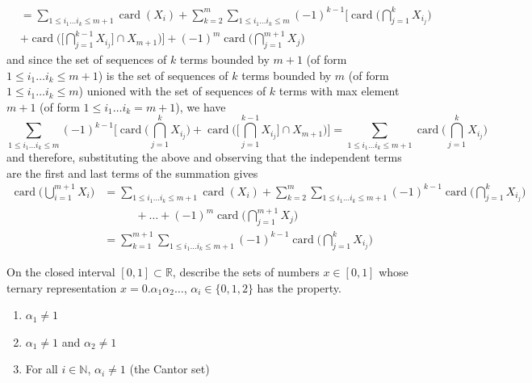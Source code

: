 \documentclass{article}
\DeclareMathOperator{\card}{card}
\begin{document}
\begin{solution}
\begin{align*}
        & = \sum_{1 \leq i_1 \ldots i_k \leq m+1} \card(X_i) + \sum_{k=2}^m \sum_{1 \leq i_1 \ldots i_k \leq m} (-1)^{k-1} \Bigg[ \card\bigg( \bigcap_{j=1}^k X_{i_j} \bigg) \\
        & +  \card\bigg( \bigg[ \bigcap_{j=1}^{k-1} X_{i_j} \bigg] \cap X_{m+1} \bigg) \Bigg] + (-1)^{m} \card\bigg( \bigcap_{j=1}^{m+1} X_j \bigg) 
    \end{align*}
    and since the set of sequences of $k$ terms bounded by $m+1$ (of form $1 \leq i_1 \ldots i_k \leq m+1$) is the set of sequences of $k$ terms bounded by $m$ (of form $1 \leq i_1 \ldots i_k \leq m$) unioned with the set of sequences of $k$ terms with max element $m+1$ (of form $1 \leq i_1 \ldots i_k = m+1$), we have 
    \[\sum_{1 \leq i_1 \ldots i_k \leq m} (-1)^{k-1} \Bigg[ \card\bigg( \bigcap_{j=1}^k X_{i_j} \bigg) +  \card\bigg( \bigg[ \bigcap_{j=1}^{k-1} X_{i_j} \bigg] \cap X_{m+1} \bigg) \Bigg] = \sum_{1 \leq i_1 \ldots i_k \leq m+1} \card\bigg( \bigcap_{j=1}^k X_{i_j} \bigg)\]
    and therefore, substituting the above and observing that the independent terms are the first and last terms of the summation gives 
    \begin{align*}
        \card \bigg( \bigcup_{i=1}^{m+1} X_i \bigg) & = \sum_{1 \leq i_1 \ldots i_k \leq m+1} \card(X_i) + \sum_{k=2}^m \sum_{1 \leq i_1 \ldots i_k \leq m+1} (-1)^{k-1} \card\bigg( \bigcap_{j=1}^k X_{i_j} \bigg) \\ 
        & \;\;\;\;\;\;\;\;\;\; + \ldots + (-1)^{m} \card\bigg( \bigcap_{j=1}^{m+1} X_j \bigg) \\
        & = \sum_{k=1}^{m+1} \sum_{1 \leq i_1 \ldots i_k \leq m+1} (-1)^{k-1} \card\bigg( \bigcap_{j=1}^k X_{i_j} \bigg) 
    \end{align*}
    \end{solution}

    \begin{exercise}[Zorich 2.4.7]
    On the closed interval $[0, 1] \subset \mathbb{R}$, describe the sets of numbers $x \in [0, 1]$ whose ternary representation $x = 0.\alpha_1 \alpha_2 \ldots $, $\alpha_i \in \{0, 1, 2\}$ has the property. 
    \begin{enumerate}
        \item $\alpha_1 \neq 1$
        \item $\alpha_1 \neq 1$ and $\alpha_2 \neq 1$ 
        \item For all $i \in \mathbb{N}$, $\alpha_i \neq 1$ (the Cantor set)
    \end{enumerate}
    \end{exercise}
\end{document}
